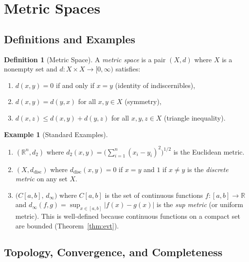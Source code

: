 \documentclass[11pt,a4paper]{article}
\theoremstyle{definition}
\newtheorem{definition}{Definition}[section]
\newtheorem{example}{Example}[section]
\theoremstyle{plain}
\theoremstyle{remark}
\newcommand{\R}{\mathbb{R}}
\begin{document}
\section{Metric Spaces}
\label{sec:metric_spaces}

\subsection{Definitions and Examples}
\label{subsec:metric_def}

\begin{definition}[Metric Space]
\label{def:metric_space}
A \emph{metric space} is a pair $(X, d)$ where $X$ is a nonempty set and
$d : X \times X \to [0, \infty)$ satisfies:
\begin{enumerate}[nosep,label=(\roman*)]
    \item $d(x, y) = 0$ if and only if $x = y$ \hfill (identity of indiscernibles),
    \item $d(x, y) = d(y, x)$ for all $x, y \in X$ \hfill (symmetry),
    \item $d(x, z) \le d(x, y) + d(y, z)$ for all $x, y, z \in X$
    \hfill (triangle inequality).
\end{enumerate}
\end{definition}

\begin{example}[Standard Examples]
\label{ex:metric_spaces}
\begin{enumerate}[nosep,label=(\alph*)]
    \item $(\R^n, d_2)$ where $d_2(x, y) = \bigl(\sum_{i=1}^n (x_i - y_i)^2
    \bigr)^{1/2}$ is the Euclidean metric.
    \item $(X, d_{\mathrm{disc}})$ where $d_{\mathrm{disc}}(x, y) = 0$ if $x = y$
    and $1$ if $x \neq y$ is the \emph{discrete metric} on any set $X$.
    \item $\bigl(C[a,b],\, d_\infty\bigr)$ where $C[a,b]$ is the set of
    continuous functions $f : [a, b] \to \R$ and $d_\infty(f, g) =
    \sup_{x \in [a,b]} |f(x) - g(x)|$ is the \emph{sup metric}
    (or uniform metric). This is well-defined because continuous functions on
    a compact set are bounded (Theorem~\ref{thm:evt}).
\end{enumerate}
\end{example}

\subsection{Topology, Convergence, and Completeness}
\label{subsec:metric_topology}
\end{document}
